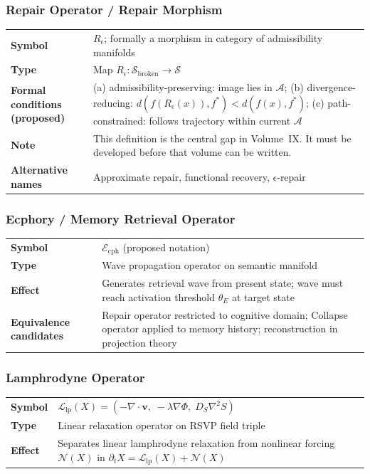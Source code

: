 \documentclass[11pt, a4paper]{article}
\begin{document}
\subsubsection{Repair Operator / Repair Morphism}

\begin{longtable}{lp{10cm}}
\textbf{Symbol} & $R_\epsilon$; formally a morphism in category of
  admissibility manifolds \\
\textbf{Type} & Map $R_\epsilon: \mathcal{S}_\mathrm{broken} \to
  \mathcal{S}$ \\
\textbf{Formal conditions (proposed)} & (a) admissibility-preserving:
  image lies in $\mathcal{A}$; (b) divergence-reducing:
  $d(f(R_\epsilon(x)), f^*) < d(f(x), f^*)$; (c) path-constrained:
  follows trajectory within current $\mathcal{A}$ \\
\textbf{Note} & This definition is the central gap in Volume~IX.
  It must be developed before that volume can be written. \\
\textbf{Alternative names} & Approximate repair, functional recovery,
  $\epsilon$-repair \\
\end{longtable}

\subsubsection{Ecphory / Memory Retrieval Operator}

\begin{longtable}{lp{10cm}}
\textbf{Symbol} & $\mathcal{E}_\mathrm{cph}$ (proposed notation) \\
\textbf{Type} & Wave propagation operator on semantic manifold \\
\textbf{Effect} & Generates retrieval wave from present state;
  wave must reach activation threshold $\theta_E$ at target state \\
\textbf{Equivalence candidates} & Repair operator restricted to cognitive
  domain; Collapse operator applied to memory history; reconstruction
  in projection theory \\
\end{longtable}

\subsubsection{Lamphrodyne Operator}

\begin{longtable}{lp{10cm}}
\textbf{Symbol} & $\mathcal{L}_\mathrm{lp}(X) =
  (-\nabla\cdot\mathbf{v},\; -\lambda\nabla\Phi,\; D_S\nabla^2 S)$ \\
\textbf{Type} & Linear relaxation operator on RSVP field triple \\
\textbf{Effect} & Separates linear lamphrodyne relaxation from nonlinear
  forcing $\mathcal{N}(X)$ in $\partial_t X = \mathcal{L}_\mathrm{lp}(X)
  + \mathcal{N}(X)$ \\
\end{longtable}
\end{document}
